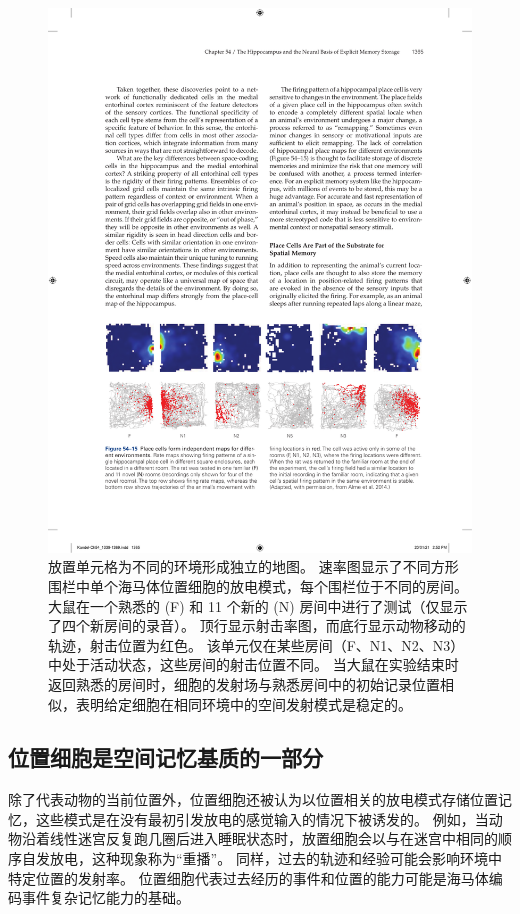 \begin{figure}[htbp]
	\centering
	\includegraphics[width=0.9\linewidth]{chap54/fig_54_15}
	\caption{放置单元格为不同的环境形成独立的地图。
		速率图显示了不同方形围栏中单个海马体位置细胞的放电模式，每个围栏位于不同的房间。
		大鼠在一个熟悉的 (F) 和 11 个新的 (N) 房间中进行了测试（仅显示了四个新房间的录音）。
		顶行显示射击率图，而底行显示动物移动的轨迹，射击位置为红色。
		该单元仅在某些房间（F、N1、N2、N3）中处于活动状态，这些房间的射击位置不同。
		当大鼠在实验结束时返回熟悉的房间时，细胞的发射场与熟悉房间中的初始记录位置相似，表明给定细胞在相同环境中的空间发射模式是稳定的\cite{alme2014place}。}
	\label{fig:54_15}
\end{figure}



\subsection{位置细胞是空间记忆基质的一部分}

除了代表动物的当前位置外，位置细胞还被认为以位置相关的放电模式存储位置记忆，这些模式是在没有最初引发放电的感觉输入的情况下被诱发的。
例如，当动物沿着线性迷宫反复跑几圈后进入睡眠状态时，放置细胞会以与在迷宫中相同的顺序自发放电，这种现象称为“重播”。
同样，过去的轨迹和经验可能会影响环境中特定位置的发射率。
位置细胞代表过去经历的事件和位置的能力可能是海马体编码事件复杂记忆能力的基础。


